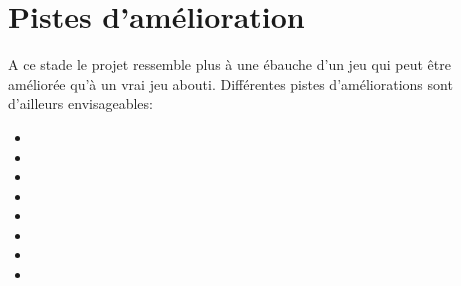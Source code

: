 \documentclass[a4paper,11pt]{article}
\begin{document}
\section{Pistes d'amélioration}
A ce stade le projet ressemble plus à une ébauche d'un jeu qui peut être améliorée qu'à un vrai jeu abouti. Différentes pistes d'améliorations sont d'ailleurs envisageables:
\begin{itemize}
	\item %
    \item %
    \item %
    \item %
    \item %
    \item %
    \item %
    \item %
\end{itemize}
\end{document}
